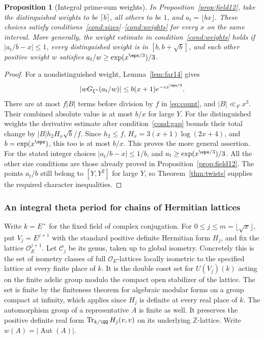 \documentclass[a4paper,11pt]{article}
\newtheorem{proposition}{Proposition}[section]
\theoremstyle{definition}
\theoremstyle{remark}
\newcommand{\ZZ}{\mathbb Z}\newcommand{\ord}{\operatorname{ord}}
\numberwithin{equation}{section}
\begin{document}
\begin{proposition}[Integral prime-sum weights]\label{prop:weights14}
In Proposition~\ref{prop:field12}, take the distinguished weights to be \(\lceil b\rceil\), all others to be \(1\), and \(a_t=\lfloor bx\rfloor\). These choices satisfy conditions~\ref{cond:sizes}--\ref{cond:weights} for every \(x\) on the same interval. More generally, the weight estimate in condition~\ref{cond:weights} holds if \(|a_t/b-x|\le1\), every distinguished weight is in \([b,b+\sqrt b]\), and each other positive weight \(w\) satisfies \(a_t/w\ge\exp(x^{\eps/3})/3\).
\end{proposition}
\begin{proof}
For a nondistinguished weight, Lemma~\ref{lem:far14} gives
\[
 |w G_{\xi^*}(a_t/w)|\le b(x+1)e^{-c x^{\eps/8}}.
\]
There are at most \(f|B|\) terms before division by \(f\) in \eqref{eq:count}, and \(|B|\ll_F x^3\). Their combined absolute value is at most \(b/x\) for large \(Y\). For the distinguished weights the derivative estimate after condition~\ref{cond:gap} bounds their total change by \(|B|h_2 H_x\sqrt b/f\). Since \(h_2\le f\), \(H_x=3(x+1)\log(2x+4)\), and \(b=\exp(x^\eps)\), this too is at most \(b/x\). This proves the more general assertion. For the stated integer choices \(|a_t/b-x|\le1/b\), and \(a_t\ge\exp(x^{\eps/3})/3\). All the other size conditions are those already proved in Proposition~\ref{prop:field12}. The points \(a_t/b\) still belong to \([Y,Y^2]\) for large \(Y\), so Theorem~\ref{thm:twists} supplies the required character inequalities.
\end{proof}

\subsubsection{An integral theta period for chains of Hermitian lattices}\label{nav:II-06}
Write \(k=E^+\) for the fixed field of complex conjugation. For \(0\le j\le m=\lfloor\sqrt{x}\rfloor\), put \(V_j=E^{j+1}\) with the standard positive definite Hermitian form \(H_j\), and fix the lattice \(\mathcal O_E^{j+1}\). Let \(\mathcal C_j\) be its genus, taken up to global isometry. Concretely this is the set of isometry classes of full \(\mathcal O_E\)-lattices locally isometric to the specified lattice at every finite place of \(k\). It is the double coset set for \(U(V_j)(k)\) acting on the finite adelic group modulo the compact open stabilizer of the lattice. The set is finite by the finiteness theorem for algebraic modular forms on a group compact at infinity, which applies since \(H_j\) is definite at every real place of \(k\). The automorphism group of a representative \(A\) is finite as well. It preserves the positive definite real form \(\operatorname{Tr}_{k/\QQ}H_j(v,v)\) on its underlying \(\ZZ\)-lattice. Write \(w(A)=|\operatorname{Aut}(A)|\).~\cite{I-I-II-gross14}
\end{document}
